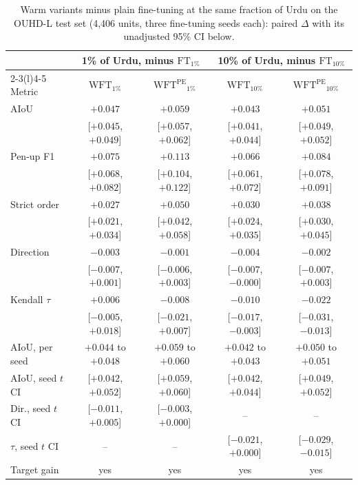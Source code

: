 \documentclass[10pt,a4paper]{article}
\newcommand{\botrule}{\bottomrule}
\newcommand{\FT}[1]{\mathrm{FT}_{#1}}
\newcommand{\WFT}[1]{\mathrm{WFT}_{#1}}
\newcommand{\WFTpe}[1]{\mathrm{WFT}^{\mathrm{PE}}{}_{#1}}
\begin{document}
\begin{table}[!htbp]
\centering
\caption{Warm variants minus plain fine-tuning at the same fraction of Urdu on the OUHD-L test set (4,406 units, three fine-tuning seeds each): paired $\Delta$ with its unadjusted 95\% CI below.}\label{tabS:warm}
\scriptsize\setlength{\tabcolsep}{4pt}
\begin{tabular}{@{}lcccc@{}}
\toprule
 & \multicolumn{2}{c}{1\% of Urdu, minus $\FT{1\%}$} & \multicolumn{2}{c}{10\% of Urdu, minus $\FT{10\%}$}\\
\cmidrule(lr){2-3}\cmidrule(l){4-5}
Metric & $\WFT{1\%}$ & $\WFTpe{1\%}$ & $\WFT{10\%}$ & $\WFTpe{10\%}$\\
\midrule
AIoU & $+0.047$ & $+0.059$ & $+0.043$ & $+0.051$\\
 & [$+0.045$, $+0.049$] & [$+0.057$, $+0.062$] & [$+0.041$, $+0.044$] & [$+0.049$, $+0.052$]\\
Pen-up F1 & $+0.075$ & $+0.113$ & $+0.066$ & $+0.084$\\
 & [$+0.068$, $+0.082$] & [$+0.104$, $+0.122$] & [$+0.061$, $+0.072$] & [$+0.078$, $+0.091$]\\
Strict order & $+0.027$ & $+0.050$ & $+0.030$ & $+0.038$\\
 & [$+0.021$, $+0.034$] & [$+0.042$, $+0.058$] & [$+0.024$, $+0.035$] & [$+0.030$, $+0.045$]\\
Direction & $-0.003$ & $-0.001$ & $-0.004$ & $-0.002$\\
 & [$-0.007$, $+0.001$] & [$-0.006$, $+0.003$] & [$-0.007$, $-0.000$] & [$-0.007$, $+0.003$]\\
Kendall $\tau$ & $+0.006$ & $-0.008$ & $-0.010$ & $-0.022$\\
 & [$-0.005$, $+0.018$] & [$-0.021$, $+0.007$] & [$-0.017$, $-0.003$] & [$-0.031$, $-0.013$]\\
\midrule
AIoU, per seed & $+0.044$ to $+0.048$ & $+0.059$ to $+0.060$ & $+0.042$ to $+0.043$ & $+0.050$ to $+0.051$\\
AIoU, seed $t$ CI & [$+0.042$, $+0.052$] & [$+0.059$, $+0.060$] & [$+0.042$, $+0.044$] & [$+0.049$, $+0.052$]\\
Dir., seed $t$ CI & [$-0.011$, $+0.005$] & [$-0.003$, $+0.000$] & -- & --\\
$\tau$, seed $t$ CI & -- & -- & [$-0.021$, $+0.000$] & [$-0.029$, $-0.015$]\\
Target gain & yes & yes & yes & yes\\
\botrule
\end{tabular}
\par{}
\end{table}
\FloatBarrier
\end{document}
